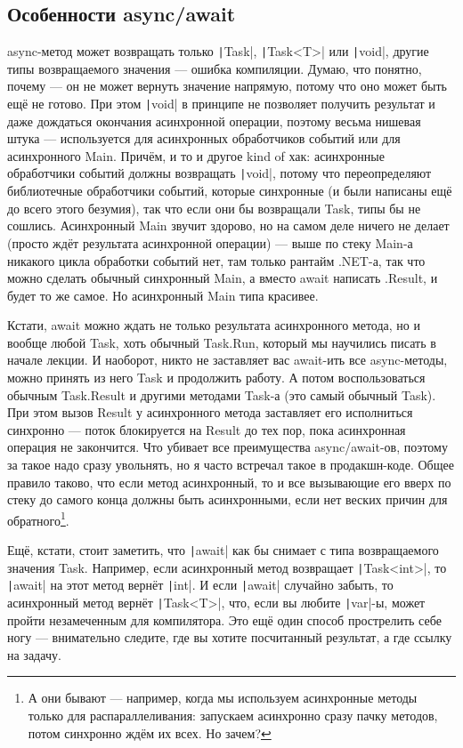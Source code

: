 \documentclass[a5paper]{article}
\begin{document}
\subsection{Особенности async/await}

async-метод может возвращать только \texttt|Task|, \texttt|Task<T>| или \texttt|void|, другие типы возвращаемого значения --- ошибка компиляции. Думаю, что понятно, почему --- он не может вернуть значение напрямую, потому что оно может быть ещё не готово. При этом \texttt|void| в принципе не позволяет получить результат и даже дождаться окончания асинхронной операции, поэтому весьма нишевая штука --- используется для асинхронных обработчиков событий или для асинхронного Main. Причём, и то и другое kind of хак: асинхронные обработчики событий должны возвращать \texttt|void|, потому что переопределяют библиотечные обработчики событий, которые синхронные (и были написаны ещё до всего этого безумия), так что если они бы возвращали Task, типы бы не сошлись. Асинхронный Main звучит здорово, но на самом деле ничего не делает (просто ждёт результата асинхронной операции) --- выше по стеку Main-а никакого цикла обработки событий нет, там только рантайм .NET-а, так что можно сделать обычный синхронный Main, а вместо await написать .Result, и будет то же самое. Но асинхронный Main типа красивее.

Кстати, await можно ждать не только результата асинхронного метода, но и вообще любой Task, хоть обычный Task.Run, который мы научились писать в начале лекции. И наоборот, никто не заставляет вас await-ить все async-методы, можно принять из него Task и продолжить работу. А потом воспользоваться обычным Task.Result и другими методами Task-а (это самый обычный Task). При этом вызов Result у асинхронного метода заставляет его исполниться синхронно --- поток блокируется на Result до тех пор, пока асинхронная операция не закончится. Что убивает все преимущества async/await-ов, поэтому за такое надо сразу увольнять, но я часто встречал такое в продакшн-коде. Общее правило таково, что если метод асинхронный, то и все вызывающие его вверх по стеку до самого конца должны быть асинхронными, если нет веских причин для обратного\footnote{А они бывают --- например, когда мы используем асинхронные методы только для распараллеливания: запускаем асинхронно сразу пачку методов, потом синхронно ждём их всех. Но зачем?}.

Ещё, кстати, стоит заметить, что \texttt|await| как бы снимает с типа возвращаемого значения Task. Например, если асинхронный метод возвращает \texttt|Task<int>|, то \texttt|await| на этот метод вернёт \texttt|int|. И если \texttt|await| случайно забыть, то асинхронный метод вернёт \texttt|Task<T>|, что, если вы любите \texttt|var|-ы, может пройти незамеченным для компилятора. Это ещё один способ прострелить себе ногу --- внимательно следите, где вы хотите посчитанный результат, а где ссылку на задачу.
\end{document}

